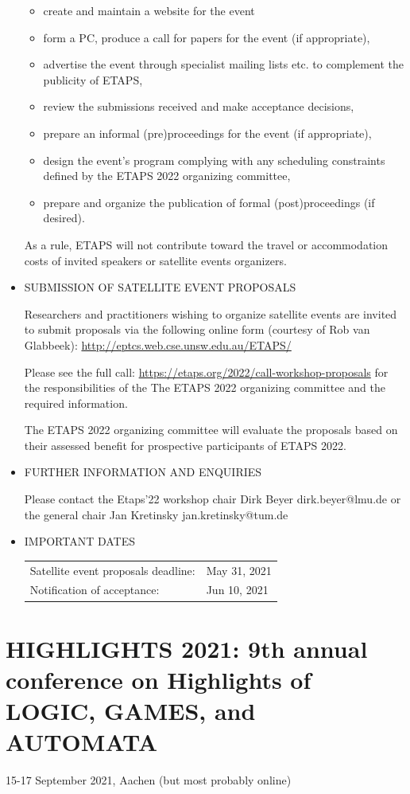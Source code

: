 \documentclass[prodmode,acmtecs]{acmsmall} %
\begin{document}
\begin{itemize}
\begin{itemize}\item  create and maintain a website for the event
\item  form a PC, produce a call for papers for the event (if appropriate), 
\item  advertise the event through specialist mailing lists etc. to complement the publicity of ETAPS, 
\item  review the submissions received and make acceptance decisions, 
\item  prepare an informal (pre)proceedings for the event (if appropriate), 
\item  design the event's program complying with any scheduling constraints defined by the ETAPS 2022 organizing committee, 
\item  prepare and organize the publication of formal (post)proceedings (if desired). 
\end{itemize} 
  As a rule, ETAPS will not contribute toward the travel or accommodation costs of invited speakers or satellite events organizers.  
 
\item  SUBMISSION OF SATELLITE EVENT PROPOSALS 
 
  Researchers and practitioners wishing to organize satellite events are invited to submit proposals via the following online form (courtesy of Rob van Glabbeek): \href{http://eptcs.web.cse.unsw.edu.au/ETAPS/}{http://eptcs.web.cse.unsw.edu.au/ETAPS/}  
 
  Please see the full call: \href{https://etaps.org/2022/call-workshop-proposals}{https://etaps.org/2022/call-workshop-proposals} for the responsibilities of the  The ETAPS 2022 organizing committee and the required information. 
 
  The ETAPS 2022 organizing committee will evaluate the proposals based on their assessed benefit for prospective participants of ETAPS 2022.  
 
\item  FURTHER INFORMATION AND ENQUIRIES 
 
  Please contact the Etaps'22 workshop chair Dirk Beyer dirk.beyer@lmu.de or the general chair Jan Kretinsky jan.kretinsky@tum.de 
 
\item  IMPORTANT DATES 
 
\begin{tabulary}{\linewidth}{LL}Satellite event proposals deadline:  & May 31, 2021 \\
Notification of acceptance:  & Jun 10, 2021 \\
\end{tabulary}
 
\end{itemize}\section{HIGHLIGHTS 2021: 9th annual conference on Highlights of LOGIC, GAMES, and AUTOMATA}\label{HIGHLIGHTS2021}  15-17 September 2021, Aachen (but most probably online)\\ 
\end{document}
